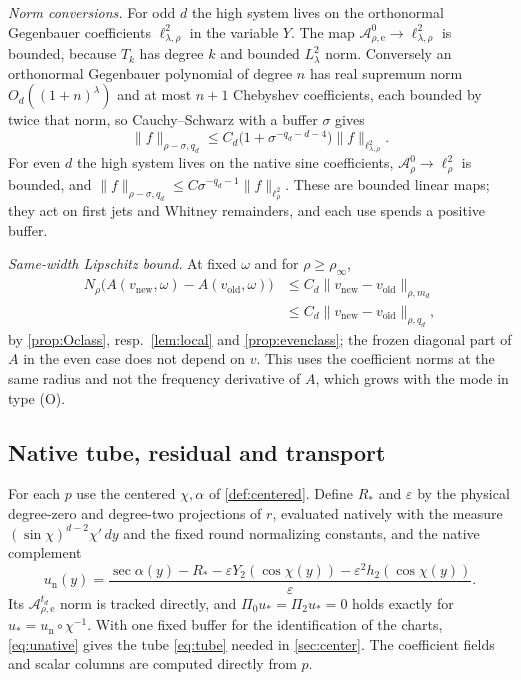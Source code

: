 \documentclass[11pt]{amsart}
\numberwithin{equation}{section}
\theoremstyle{definition}
\theoremstyle{remark}
\newcommand{\eps}{\varepsilon}
\newcommand{\norm}[1]{\lVert #1\rVert}
\newcommand{\Wn}{\mathcal A}
\begin{document}
\emph{Norm conversions.} For odd $d$ the high system lives on the orthonormal Gegenbauer coefficients $\ell^2_{\lambda,\rho}$ in the variable $Y$. The map $\Wn^0_{\rho,\mathrm e}\to\ell^2_{\lambda,\rho}$ is bounded, because $T_k$ has degree $k$ and bounded $L^2_\lambda$ norm. Conversely an orthonormal Gegenbauer polynomial of degree $n$ has real supremum norm $O_d((1+n)^\lambda)$ and at most $n+1$ Chebyshev coefficients, each bounded by twice that norm, so Cauchy--Schwarz with a buffer $\sigma$ gives
\begin{equation}\label{eq:conv}
\norm f_{\rho-\sigma,q_d}\le C_d\bigl(1+\sigma^{-q_d-d-4}\bigr)\norm f_{\ell^2_{\lambda,\rho}} .
\end{equation}
For even $d$ the high system lives on the native sine coefficients, $\Wn^0_\rho\to\ell^2_\rho$ is bounded, and $\norm f_{\rho-\sigma,q_d}\le C\sigma^{-q_d-1}\norm f_{\ell^2_\rho}$. These are bounded linear maps; they act on first jets and Whitney remainders, and each use spends a positive buffer.

\emph{Same-width Lipschitz bound.} At fixed $\omega$ and for $\rho\ge\rho_\infty$,
\begin{equation}\label{eq:samewidth}
\begin{aligned}
N_\rho\bigl(A(v_{\mathrm{new}},\omega)-A(v_{\mathrm{old}},\omega)\bigr)&\le C_d\norm{v_{\mathrm{new}}-v_{\mathrm{old}}}_{\rho,m_d}\\
&\le C_d\norm{v_{\mathrm{new}}-v_{\mathrm{old}}}_{\rho,q_d},
\end{aligned}
\end{equation}
by \cref{prop:Oclass}, resp.\ \cref{lem:local} and \cref{prop:evenclass}; the frozen diagonal part of $A$ in the even case does not depend on $v$. This uses the coefficient norms at the same radius and not the frequency derivative of $A$, which grows with the mode in type (O).

\subsection{Native tube, residual and transport}
For each $p$ use the centered $\chi,\alpha$ of \cref{def:centered}. Define $R_*$ and $\eps$ by the physical degree-zero and degree-two projections of $r$, evaluated natively with the measure $(\sin\chi)^{d-2}\chi'\,dy$ and the fixed round normalizing constants, and the native complement
\begin{equation}\label{eq:unative}
u_{\mathrm n}(y)=\frac{\sec\alpha(y)-R_*-\eps Y_2(\cos\chi(y))-\eps^2h_2(\cos\chi(y))}{\eps}.
\end{equation}
Its $\Wn^{t_d}_{\rho,\mathrm e}$ norm is tracked directly, and $\Pi_0u_*=\Pi_2u_*=0$ holds exactly for $u_*=u_{\mathrm n}\circ\chi^{-1}$. With one fixed buffer for the identification of the charts, \eqref{eq:unative} gives the tube \eqref{eq:tube} needed in \cref{sec:center}. The coefficient fields and scalar columns are computed directly from $p$.
\end{document}
